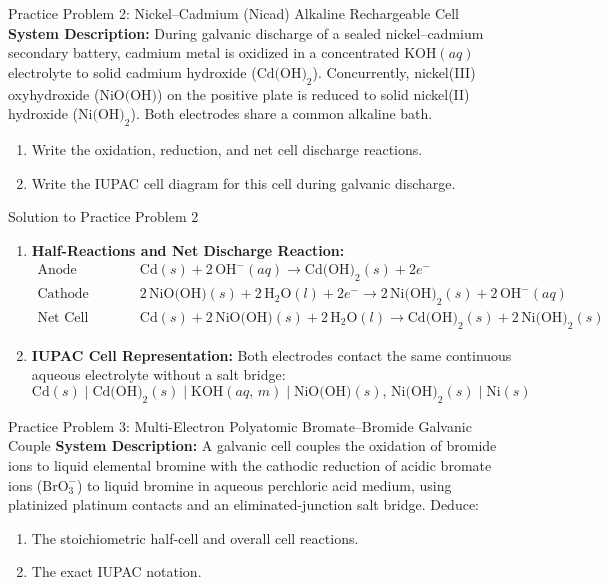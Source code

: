 \documentclass[10pt,a4paper]{article}
\begin{document}
\begin{exercisebox}{Practice Problem 2: Nickel--Cadmium (Nicad) Alkaline Rechargeable Cell}
\textbf{System Description:}
During galvanic discharge of a sealed nickel--cadmium secondary battery, cadmium metal is oxidized in a concentrated $\text{KOH}(aq)$ electrolyte to solid cadmium hydroxide ($\text{Cd(OH)}_2$). Concurrently, nickel(III) oxyhydroxide ($\text{NiO(OH)}$) on the positive plate is reduced to solid nickel(II) hydroxide ($\text{Ni(OH)}_2$). Both electrodes share a common alkaline bath.
\begin{enumerate}[label=(\alph*)]
    \item Write the oxidation, reduction, and net cell discharge reactions.
    \item Write the IUPAC cell diagram for this cell during galvanic discharge.
\end{enumerate}
\end{exercisebox}

\begin{solutionbox}{Solution to Practice Problem 2}
\begin{enumerate}[label=(\alph*)]
    \item \textbf{Half-Reactions and Net Discharge Reaction:}
    \begin{align*}
        \text{Anode (Oxidation):} \quad & \text{Cd}(s) + 2\,\text{OH}^-(aq) \longrightarrow \text{Cd(OH)}_2(s) + 2e^- \\
        \text{Cathode (Reduction):} \quad & 2\,\text{NiO(OH)}(s) + 2\,\text{H}_2\text{O}(l) + 2e^- \longrightarrow 2\,\text{Ni(OH)}_2(s) + 2\,\text{OH}^-(aq) \\
        \text{Net Cell Reaction:} \quad & \text{Cd}(s) + 2\,\text{NiO(OH)}(s) + 2\,\text{H}_2\text{O}(l) \longrightarrow \text{Cd(OH)}_2(s) + 2\,\text{Ni(OH)}_2(s)
    \end{align*}
    \item \textbf{IUPAC Cell Representation:}
    Both electrodes contact the same continuous aqueous electrolyte without a salt bridge:
    $$\text{Cd}(s) \mid \text{Cd(OH)}_2(s) \mid \text{KOH}(aq,\, m) \mid \text{NiO(OH)}(s),\, \text{Ni(OH)}_2(s) \mid \text{Ni}(s)$$
\end{enumerate}
\end{solutionbox}

\begin{exercisebox}{Practice Problem 3: Multi-Electron Polyatomic Bromate--Bromide Galvanic Couple}
\textbf{System Description:}
A galvanic cell couples the oxidation of bromide ions to liquid elemental bromine with the cathodic reduction of acidic bromate ions ($\text{BrO}_3^-$) to liquid bromine in aqueous perchloric acid medium, using platinized platinum contacts and an eliminated-junction salt bridge. Deduce:
\begin{enumerate}[label=(\alph*)]
    \item The stoichiometric half-cell and overall cell reactions.
    \item The exact IUPAC notation.
\end{enumerate}
\end{exercisebox}
\end{document}

